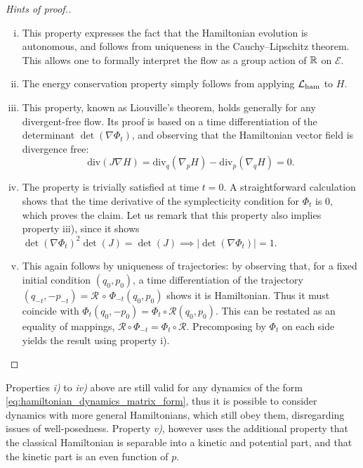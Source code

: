     \begin{proof}[Hints of proof.]
        \begin{enumerate}[i)]
            \item This property expresses the fact that the Hamiltonian evolution is autonomous, and follows from uniqueness in the Cauchy--Lipschitz theorem. This allows one to formally interpret the flow as a group action of $\mathbb{R}$ on $\mathcal E$.
            \item The energy conservation property simply follows from applying $\mathcal{L}_{\rm ham}$ to $H$.
            \item This property, known as Liouville's theorem, holds generally for any divergent-free flow. Its proof is based on a time differentiation of the determinant $\det\left(\nabla \Phi_t\right)$, and observing that the Hamiltonian vector field is divergence free: \[\mathrm{div}\left(J\nabla H\right)=\mathrm{div}_q\left(\nabla_p H\right)-\mathrm{div}_p\left(\nabla_q H\right)=0.\]
            \item The property is trivially satisfied at time $t=0$. A straightforward calculation shows that the time derivative of the symplecticity condition for $\Phi_t$ is $0$, which proves the claim. Let us remark that this property also implies property iii), since it shows $\det(\nabla\Phi_t)^2\det(J)=\det(J) \implies |\det(\nabla\Phi_t)|=1$.
            \item This again follows by uniqueness of trajectories: by observing that, for a fixed initial condition $(q_0,p_0)$, a time differentiation of the trajectory $(q_{-t},-p_{-t})=\mathcal R\, \circ\, \Phi_{-t}(q_0,p_0)$  shows it is Hamiltonian. Thus it must coincide with $\Phi_t(q_0,-p_0)=\Phi_t \circ \mathcal R (q_0,p_0)$. This can be restated as an equality of mappings, $\mathcal R \circ \Phi_{-t}=\Phi_t \circ \mathcal R$. Precomposing by $\Phi_t$ on each side yields the result using property i).
        \end{enumerate}
    \end{proof}

    \begin{remark}
        \label{rem:non_separable_hamiltonian}
        Properties \textit{i)} to \textit{iv)} above are still valid for any dynamics of the form \eqref{eq:hamiltonian_dynamics_matrix_form}, thus it is possible to consider dynamics 
        with more general Hamiltonians, which still obey them, disregarding issues of well-posedness. Property \textit{v)}, however uses the additional
        property that the classical Hamiltonian is separable into a kinetic and potential part, and that the kinetic part is an even function of $p$.
    \end{remark}   

